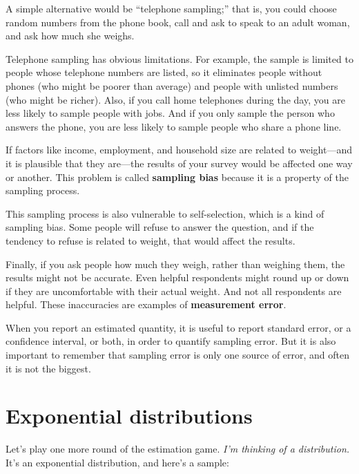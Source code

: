 \documentclass[12pt]{book}
\theoremstyle{exercise}
\begin{document}
A simple alternative would be
``telephone sampling;'' that is,
you could choose random numbers from the phone book, call and ask to
speak to an adult woman, and ask how much she weighs.%
%

Telephone sampling has obvious limitations.  For example, the sample
is limited to people whose telephone numbers are listed, so it
eliminates people without phones (who might be poorer than average)
and people with unlisted numbers (who might be richer).  Also, if you
call home telephones during the day, you are less likely to sample
people with jobs.  And if you only sample the person who answers the
phone, you are less likely to sample people who share a phone line.

If factors like income, employment, and household size are related
to weight---and it is plausible that they are---the results of your
survey would be affected one way or another.  This problem is
called {\bf sampling bias} because it is a property of the sampling
process.%

This sampling process is also vulnerable to self-selection, which is a
kind of sampling bias.  Some people will refuse to answer the
question, and if the tendency to refuse is related to weight, that
would affect the results.%

Finally, if you ask people how much they weigh, rather than weighing
them, the results might not be accurate.  Even helpful respondents
might round up or down if they are uncomfortable with their actual
weight.  And not all respondents are helpful.  These inaccuracies are
examples of {\bf measurement error}.%

When you report an estimated quantity, it is useful to report
standard error, or a confidence interval, or both, in order to
quantify sampling error.  But it is also important to remember that
sampling error is only one source of error, and often it is not the
biggest.%
%


\section{Exponential distributions}%
%

Let's play one more round of the estimation game.
{\em I'm thinking of a distribution.\/}  It's an exponential distribution, and 
here's a sample:
\end{document}
